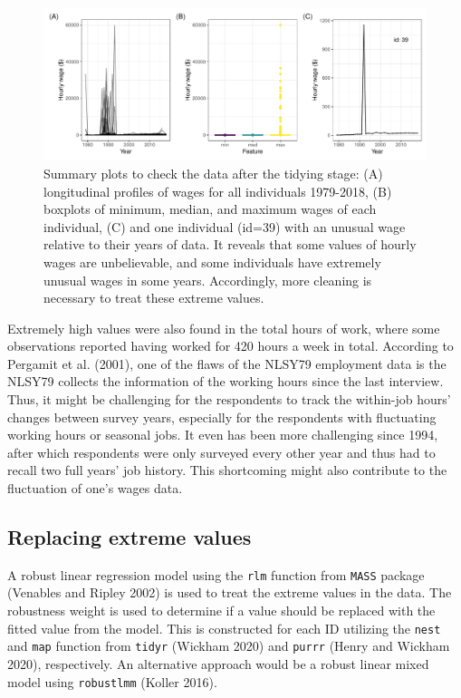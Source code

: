 \documentclass{article}
\begin{document}
\begin{figure}

{\centering \includegraphics[width=1\linewidth]{figures/feature-plot-1} 

}

\caption{Summary plots to check the data after the tidying stage: (A) longitudinal profiles of wages for all individuals 1979-2018, (B) boxplots of minimum, median, and maximum wages of each individual, (C) and one individual (id=39) with an unusual wage relative to their years of data. It reveals that some values of hourly wages are unbelievable, and some individuals have extremely unusual wages in some years. Accordingly, more cleaning is necessary to treat these extreme values.}\label{fig:feature-plot}
\end{figure}

Extremely high values were also found in the total hours of work, where some observations reported having worked for 420 hours a week in total. According to Pergamit et al. (2001), one of the flaws of the NLSY79 employment data is the NLSY79 collects the information of the working hours since the last interview. Thus, it might be challenging for the respondents to track the within-job hours' changes between survey years, especially for the respondents with fluctuating working hours or seasonal jobs. It even has been more challenging since 1994, after which respondents were only surveyed every other year and thus had to recall two full years' job history. This shortcoming might also contribute to the fluctuation of one's wages data.

\hypertarget{censor}{%
\subsection{Replacing extreme values}\label{censor}}

A robust linear regression model using the \texttt{rlm} function from \texttt{MASS} package (Venables and Ripley 2002) is used to treat the extreme values in the data. The robustness weight is used to determine if a value should be replaced with the fitted value from the model. This is constructed for each ID utilizing the \texttt{nest} and \texttt{map} function from \texttt{tidyr} (Wickham 2020) and \texttt{purrr} (Henry and Wickham 2020), respectively. An alternative approach would be a robust linear mixed model using \texttt{robustlmm} (Koller 2016).
\end{document}
